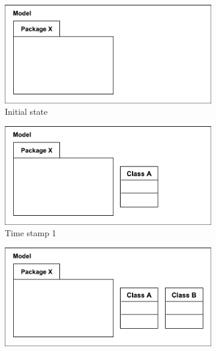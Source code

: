 \documentclass{llncs}
\begin{document}
\begin{figure}[t]
    \begin{subfigure}[t]{0.245\linewidth}
        \centering
        \includegraphics[width=\linewidth]{images/illustration_1}
        \caption{Initial state}
        \label{fig:illustration_1}
    \end{subfigure}
    \begin{subfigure}[t]{0.245\linewidth}
        \centering
        \includegraphics[width=\linewidth]{images/illustration_2}
        \caption{Time stamp 1}
        \label{fig:illustration_2}
    \end{subfigure}
    \begin{subfigure}[t]{0.245\linewidth}
        \centering
        \includegraphics[width=\linewidth]{images/illustration_3}

\end{subfigure}
\end{figure}
\end{document}
